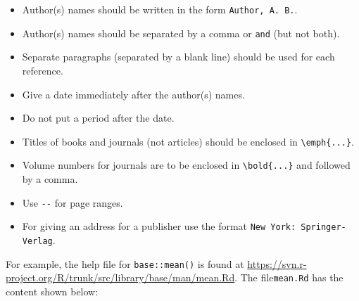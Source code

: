 \documentclass[
  letterpaper,
  DIV=11,
  numbers=noendperiod]{scrreprt}
\providecommand{\tightlist}{%
  \setlength{\itemsep}{0pt}\setlength{\parskip}{0pt}}\usepackage{longtable,booktabs,array}
\begin{document}
\begin{enumerate}
  \begin{itemize}
  \tightlist
  \item
    Author(s) names should be written in the form
    \texttt{Author,\ A.\ B.}.
  \item
    Author(s) names should be separated by a comma or \texttt{and} (but
    not both).
  \item
    Separate paragraphs (separated by a blank line) should be used for
    each reference.
  \item
    Give a date immediately after the author(s) names.
  \item
    Do not put a period after the date.
  \item
    Titles of books and journals (not articles) should be enclosed in
    \texttt{\textbackslash{}emph\{...\}}.
  \item
    Volume numbers for journals are to be enclosed in
    \texttt{\textbackslash{}bold\{...\}} and followed by a comma.
  \item
    Use \texttt{-\/-} for page ranges.
  \item
    For giving an address for a publisher use the format
    \texttt{New\ York:\ Springer-Verlag}.
  \end{itemize}
\end{enumerate}

For example, the help file for \texttt{base::mean()} is found at
\url{https://svn.r-project.org/R/trunk/src/library/base/man/mean.Rd}.
The file\texttt{mean.Rd} has the content shown below:
\end{document}
